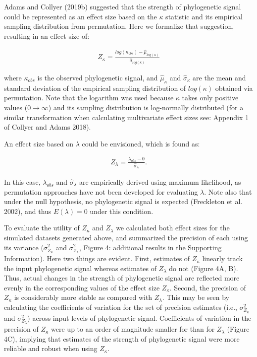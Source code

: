 \documentclass[
]{article}
\begin{document}
Adams and Collyer (2019b) suggested that the strength of phylogenetic
signal could be represented as an effect size based on the \(\kappa\)
statistic and its empirical sampling distribution from permutation. Here
we formalize that suggestion, resulting in an effect size of:

\begin{align}
    Z_\kappa=\frac{log(\kappa_{obs})-\hat\mu_{log(\kappa)}}{\hat\sigma_{log(\kappa)}}
\end{align}

where \(\kappa_{obs}\) is the observed phylogenetic signal, and
\(\hat\mu_\kappa\) and \(\hat\sigma_\kappa\) are the mean and standard
deviation of the empirical sampling distribution of \(log(\kappa)\)
obtained via permutation. Note that the logarithm was used because
\(\kappa\) takes only positive values (\(0\to\infty\)) and its sampling
distribution is log-normally distributed (for a similar transformation
when calculating multivariate effect sizes see: Appendix 1 of Collyer
and Adams 2018). \hfill\break

An effect size based on \(\lambda\) could be envisioned, which is found
as:

\begin{align}
    Z_{\lambda}=\frac{\lambda_{obs}-0}{\hat\sigma_\lambda}.
\end{align}

In this case, \(\lambda_{obs}\) and \(\hat\sigma_\lambda\) are
empirically derived using maximum likelihood, as permutation approaches
have not been developed for evaluating \(\lambda\). Note also that under
the null hypothesis, no phylogenetic signal is expected (Freckleton et
al. 2002), and thus \(E(\lambda)=0\) under this condition. \hfill\break

To evaluate the utility of \(Z_\kappa\) and \(Z_\lambda\) we calculated
both effect sizes for the simulated datasets generated above, and
summarized the precision of each using its variance
(\(\sigma^2_{Z_\kappa}\) and \(\sigma^2_{Z_\lambda}\), Figure 4:
additional results in the Supporting Information). Here two things are
evident. First, estimates of \(Z_\kappa\) linearly track the input
phylogenetic signal whereas estimates of \(Z_\lambda\) do not (Figure
4A, B). Thus, actual changes in the strength of phylogenetic signal are
reflected more evenly in the corresponding values of the effect size
\(Z_\kappa\). Second, the precision of \(Z_\kappa\) is considerably more
stable as compared with \(Z_\lambda\). This may be seen by calculating
the coefficients of variation for the set of precision estimates (i.e.,
\(\sigma^2_{Z_\kappa}\) and \(\sigma^2_{Z_\lambda}\)) across input
levels of phylogenetic signal. Coefficients of variation in the
precision of \(Z_\kappa\) were up to an order of magnitude smaller for
than for \(Z_\lambda\) (Figure 4C), implying that estimates of the
strength of phylogenetic signal were more reliable and robust when using
\(Z_\kappa\). \hfill\break
\end{document}
